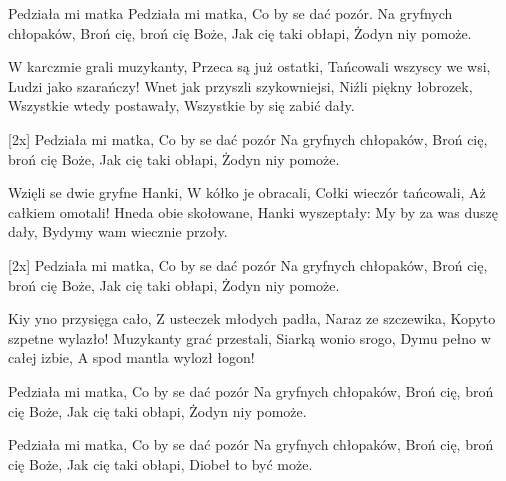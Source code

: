 Pedziała mi matka
Pedziała mi matka,
Co by se dać pozór.
Na gryfnych chłopaków,
Broń cię, broń cię Boże,
Jak cię taki obłapi, 
Żodyn niy pomoże.

W karczmie grali muzykanty,
Przeca są już ostatki,
Tańcowali wszyscy we wsi, 
Ludzi jako szarańczy!
Wnet jak przyszli szykowniejsi,
Niźli piękny łobrozek,
Wszystkie wtedy postawały, 
Wszystkie by się zabić dały.

[2x]
Pedziała mi matka,
Co by se dać pozór
Na gryfnych chłopaków,
Broń cię, broń cię Boże,
Jak cię taki obłapi, 
Żodyn niy pomoże.

Wzięli se dwie gryfne Hanki,
W kółko je obracali,
Cołki wieczór tańcowali,
Aż całkiem omotali!
Hneda obie skołowane,
Hanki wyszeptały:
My by za was duszę dały,
Bydymy wam wiecznie przoły.

[2x]
Pedziała mi matka,
Co by se dać pozór
Na gryfnych chłopaków,
Broń cię, broń cię Boże,
Jak cię taki obłapi, 
Żodyn niy pomoże.

Kiy yno przysięga cało,
Z usteczek młodych padła,
Naraz ze szczewika,
Kopyto szpetne wylazło!
Muzykanty grać przestali,
Siarką wonio srogo,
Dymu pełno w całej izbie, 
A spod mantla wylozł łogon!

Pedziała mi matka,
Co by se dać pozór
Na gryfnych chłopaków,
Broń cię, broń cię Boże,
Jak cię taki obłapi, 
Żodyn niy pomoże.

Pedziała mi matka,
Co by se dać pozór
Na gryfnych chłopaków,
Broń cię, broń cię Boże,
Jak cię taki obłapi, 
Diobeł to być może. 
